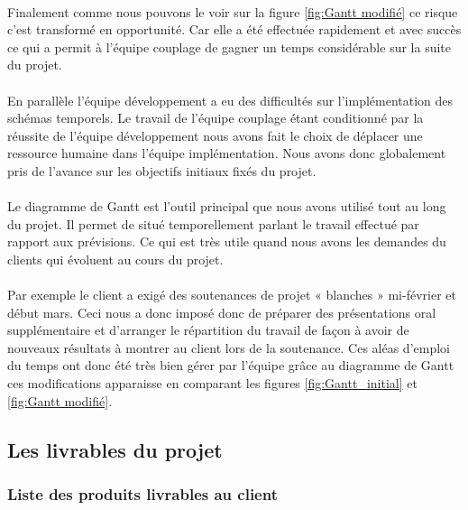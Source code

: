     \paragraph{}
    Finalement comme nous pouvons le voir sur la figure \ref{fig:Gantt modifié} ce risque c'est transformé en opportunité. Car elle a été effectuée rapidement et avec succès ce qui a permit à l'équipe couplage de gagner un temps considérable sur la suite du projet.
    \paragraph{}
    En parallèle l'équipe développement a eu des difficultés sur l'implémentation des schémas temporels. Le travail de l'équipe couplage étant conditionné par la réussite de l'équipe développement nous avons fait le choix de déplacer une ressource humaine dans l'équipe implémentation. Nous avons donc globalement pris de l'avance sur les objectifs initiaux fixés du projet. 
    \paragraph{}
    Le diagramme de Gantt est l'outil principal que nous avons utilisé tout au long du projet. Il permet de situé temporellement parlant le travail effectué par rapport aux prévisions. Ce qui est très utile quand nous avons les demandes du clients qui évoluent au cours du projet.
    \paragraph{}
    Par exemple le client a exigé des soutenances de projet « blanches » mi-février et début mars. Ceci nous a donc imposé donc de préparer des présentations oral supplémentaire et d'arranger le répartition du travail de façon à avoir de nouveaux  résultats à montrer au client lors de la soutenance. Ces aléas d'emploi du temps ont donc été très bien gérer par l'équipe grâce au diagramme de Gantt ces modifications apparaisse en comparant les figures \ref{fig:Gantt_initial} et \ref{fig:Gantt modifié}.


\subsection{Les livrables du projet}
    
    \subsubsection{Liste des produits livrables au client}
